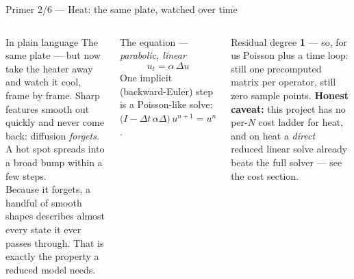 \documentclass[10pt,aspectratio=169]{beamer}
\begin{document}
\begin{frame}{Primer 2/6 --- Heat: the same plate, watched over time}
  \footnotesize
  \begin{columns}[T]
    \begin{block}{In plain language}
      The same plate --- but now take the heater away and watch it cool, frame by frame. Sharp
      features smooth out quickly and never come back: diffusion \emph{forgets}. A hot spot spreads
      into a broad bump within a few steps.\\[3pt]
      Because it forgets, a handful of smooth shapes describes almost every state it ever passes
      through. That is exactly the property a reduced model needs.
    \end{block}
    \begin{block}{The equation --- \emph{parabolic, linear}}
      \[ u_t = \alpha\,\Delta u \]
      One implicit (backward-Euler) step is a Poisson-like solve:
      $\big(I - \Delta t\,\alpha\Delta\big)\,u^{n+1} = u^{n}$.
    \end{block}
    \begin{exampleblock}{Residual degree \textbf{1} --- so, for us}
      Poisson plus a time loop: still one precomputed matrix per operator, still zero sample points.
      \textbf{Honest caveat:} this project has no per-$N$ cost ladder for heat, and on heat a
      \emph{direct} reduced linear solve already beats the full solver --- see the cost section.
    \end{exampleblock}
  \end{columns}
\end{frame}
\end{document}
